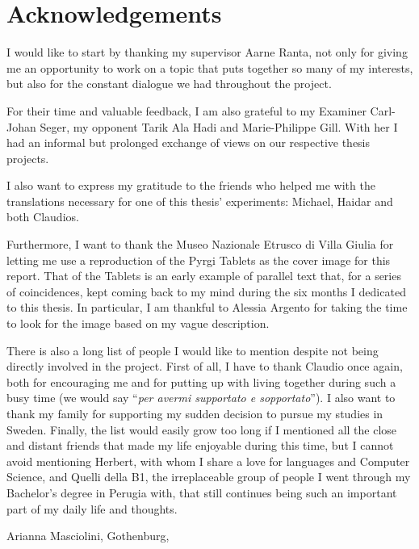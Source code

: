 \thispagestyle{plain}
\section*{Acknowledgements}
I would like to start by thanking my supervisor Aarne Ranta, not only for giving me an opportunity to work on a topic that puts together so many of my interests, but also for the constant dialogue we had throughout the project. \smallskip

For their time and valuable feedback, I am also grateful to my Examiner Carl-Johan Seger, my opponent Tarik Ala Hadi and Marie-Philippe Gill. With her I had an informal but prolonged exchange of views on our respective thesis projects. \smallskip

I also want to express my gratitude to the friends who helped me with the translations necessary for one of this thesis' experiments: Michael, Haidar and both Claudios. \smallskip

Furthermore, I want to thank the Museo Nazionale Etrusco di Villa Giulia for letting me use a reproduction of the Pyrgi Tablets as the cover image for this report. That of the Tablets is an early example of parallel text that, for a series of coincidences, kept coming back to my mind during the six months I dedicated to this thesis. In particular, I am thankful to Alessia Argento for taking the time to look for the image based on my vague description. \smallskip

There is also a long list of people I would like to mention despite not being directly involved in the project. 
First of all, I have to thank Claudio once again, both for encouraging me and for putting up with living together during such a busy time (we would say ``\textit{per avermi supportato e sopportato}'').
I also want to thank my family for supporting my sudden decision to pursue my studies in Sweden.
Finally, the list would easily grow too long if I mentioned all the close and distant friends that made my life enjoyable during this time, but I cannot avoid mentioning Herbert, with whom I share a love for languages and Computer Science, and Quelli della B1, the irreplaceable group of people I went through my Bachelor's degree in Perugia with, that still continues being such an important part of my daily life and thoughts.

\vspace{1.5cm}
\hfill
Arianna Masciolini, Gothenburg, \monthname \space \the\year

\newpage				%
\thispagestyle{empty}
\mbox{}